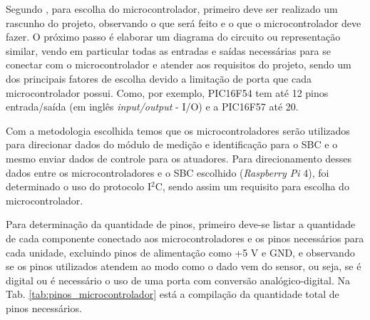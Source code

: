     Segundo \cite{morton2005pic}, para escolha do microcontrolador, primeiro deve ser realizado um rascunho do projeto, observando o que será feito e o que o microcontrolador deve fazer. O próximo passo é elaborar um diagrama do circuito ou representação similar, vendo em particular todas as entradas e saídas necessárias para se conectar com o microcontrolador e atender aos requisitos do projeto, sendo um dos principais fatores de escolha devido a limitação de porta que cada microcontrolador possui. Como, por exemplo, PIC16F54 tem até 12 pinos entrada/saída (em inglês \textit{input/output} - I/O) e a PIC16F57 até 20.
    
    Com a metodologia escolhida temos que os microcontroladores serão utilizados para direcionar dados do módulo de medição e identificação para o SBC e o mesmo enviar dados de controle para os atuadores. Para direcionamento desses dados entre os microcontroladores e o SBC escolhido (\textit{Raspberry Pi} 4), foi determinado o uso do protocolo I$^2$C, sendo assim um requisito para escolha do microcontrolador.
    
    Para determinação da quantidade de pinos, primeiro deve-se listar a quantidade de cada componente conectado aos microcontroladores e os pinos necessários para cada unidade, excluindo pinos de alimentação como +5 V e GND, e observando se os pinos utilizados atendem ao modo como o dado vem do sensor, ou seja, se é digital ou é necessário o uso de uma porta com conversão analógico-digital. Na Tab. \ref{tab:pinos_microcontrolador} está a compilação da quantidade total de pinos necessários.
    
